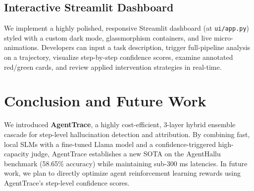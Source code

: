 \documentclass[11pt,a4paper]{article}
\begin{document}
\subsection{Interactive Streamlit Dashboard}
We implement a highly polished, responsive Streamlit dashboard (at \texttt{ui/app.py}) styled with a custom dark mode, glassmorphism containers, and live micro-animations. Developers can input a task description, trigger full-pipeline analysis on a trajectory, visualize step-by-step confidence scores, examine annotated red/green cards, and review applied intervention strategies in real-time.

\section{Conclusion and Future Work}
We introduced \textbf{AgentTrace}, a highly cost-efficient, 3-layer hybrid ensemble cascade for step-level hallucination detection and attribution. By combining fast, local SLMs with a fine-tuned Llama model and a confidence-triggered high-capacity judge, AgentTrace establishes a new SOTA on the AgentHallu benchmark (58.65\% accuracy) while maintaining sub-300 ms latencies. In future work, we plan to directly optimize agent reinforcement learning rewards using AgentTrace's step-level confidence scores.



\end{document}

